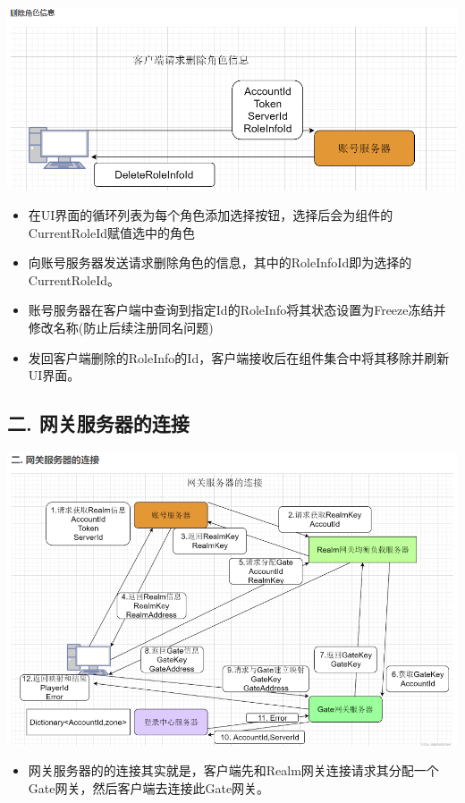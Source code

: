 \documentclass[9pt, b5paper]{article}
\begin{document}
\begin{enumerate}
\includegraphics[width=.9\linewidth]{./pic/readme_20230124_103649.png}
\begin{itemize}
\item 在UI界面的循环列表为每个角色添加选择按钮，选择后会为组件的CurrentRoleId赋值选中的角色
\item 向账号服务器发送请求删除角色的信息，其中的RoleInfoId即为选择的CurrentRoleId。
\item 账号服务器在客户端中查询到指定Id的RoleInfo将其状态设置为Freeze冻结并修改名称(防止后续注册同名问题)
\item 发回客户端删除的RoleInfo的Id，客户端接收后在组件集合中将其移除并刷新UI界面。
\end{itemize}
\end{enumerate}
\subsection{二. 网关服务器的连接}
\label{sec-3-2}

\includegraphics[width=.9\linewidth]{./pic/readme_20230124_103753.png}
\begin{itemize}
\item 网关服务器的的连接其实就是，客户端先和Realm网关连接请求其分配一个Gate网关，然后客户端去连接此Gate网关。
\end{itemize}
\end{document}
